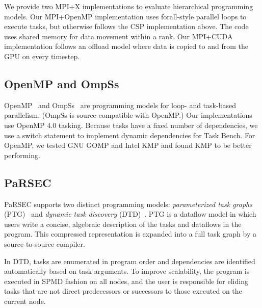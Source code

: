We provide two MPI+X implementations to evaluate hierarchical
programming models. Our MPI+OpenMP implementation uses forall-style
parallel loops to execute tasks, but otherwise follows the CSP
implementation above. The code uses shared memory for data movement
within a rank. Our MPI+CUDA implementation follows an offload model
where data is copied to and from the GPU on every timestep.

\subsection{OpenMP and OmpSs}

OpenMP~\cite{OpenMPSpec40} and OmpSs~\cite{OmpSs11} are programming
models for loop- and task-based parallelism. (OmpSs is
source-compatible with OpenMP.) Our implementations use OpenMP 4.0
tasking.  Because tasks have a fixed number of dependencies,
we use a switch statement to implement dynamic dependencies for Task
Bench. For OpenMP, we tested GNU GOMP and Intel KMP and found KMP to be better
performing.




\subsection{PaRSEC}

PaRSEC supports two distinct
programming models: \emph{parameterized task graphs}
(PTG)~\cite{PARSEC13} and \emph{dynamic task discovery}
(DTD)~\cite{PARSEC_DTD}.  PTG is a dataflow model in which users
write a concise, algebraic description of the tasks and dataflows in
the program. This compressed representation is expanded into a full
task graph by a source-to-source compiler.

In DTD, tasks are enumerated in program order and dependencies are
identified automatically based on task arguments. To improve
scalability, the program is executed in SPMD fashion on all nodes, and
the user is responsible for eliding tasks that are not direct
predecessors or successors to those executed on the current node.

